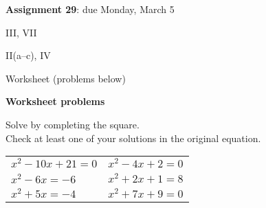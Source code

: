 \documentclass[12pt]{letter}
\newcounter{tci}
\newcommand{\tcialpha}{%
	\stepcounter{tci}%
	(\alph{tci})%
}
\newenvironment{twocolitems}
{
\setcounter{tci}{0}
\renewcommand{\arraystretch}{1.8}
\begin{tabular}{>{\makebox[0.5in]{\tcialpha}$}l<{$}>{\hspace*{0.2in}\makebox[0.5in]{\tcialpha}$}l<{$}}
}
{
\end{tabular}
}
\begin{document}
\textbf{Assignment 29}: due Monday, March 5

 III, VII

 II(a--c), IV

\quad Worksheet (problems below)



\bigskip

\textbf{Worksheet problems}

Solve by completing the square.\\Check at least one of your solutions in the original equation.

\begin{twocolitems}
	x^2-10x+21=0	& x^2-4x+2=0\\
	x^2-6x=-6	& x^2+2x+1=8\\
	x^2+5x=-4	& x^2+7x+9=0
\end{twocolitems}
\end{document}

